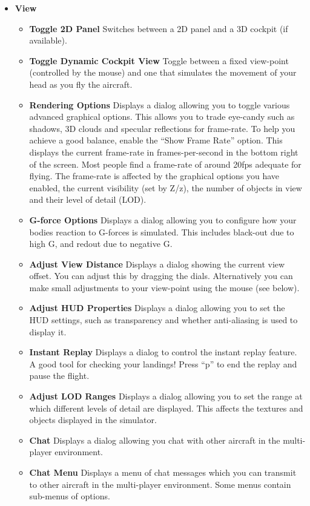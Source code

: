 \begin{itemize}
 \item \textbf{View}
 \begin{itemize}
  \item \textbf{Toggle 2D Panel}  Switches between a 2D panel and a 3D cockpit
(if available).
  \item \textbf{Toggle Dynamic Cockpit View}  Toggle between a fixed view-point
  (controlled by the mouse) and one that simulates the movement of your head as
  you fly the aircraft.
  \item \textbf{Rendering Options} Displays a dialog allowing you to toggle
various advanced graphical options.
  This allows you to trade eye-candy such as shadows, 3D clouds and specular
reflections for frame-rate.
  To help you achieve a good balance, enable the ``Show Frame Rate'' option.
  This displays the current frame-rate in frames-per-second in the bottom right
of the screen.
  Most people find a frame-rate of around 20fps adequate for flying. The
frame-rate is affected by the
  graphical options you have enabled, the current visibility (set by Z/z), the
number of objects in view
  and their level of detail (LOD).
  \item \textbf{G-force Options}  Displays a dialog allowing you to configure
how your bodies reaction to G-forces is simulated. This includes black-out due
to high G, and redout due to negative G.
  \item \textbf{Adjust View Distance}  Displays a dialog showing the current
view offset.
  You can adjust this by dragging the dials. Alternatively you can make small
adjustments
  to your view-point using the mouse (see below).
  \item \textbf{Adjust HUD Properties}  Displays a dialog allowing you to set
the HUD settings, such as transparency and whether anti-aliasing is used to display it.
  \item \textbf{Instant Replay} Displays a dialog to control the instant replay
feature.
  A good tool for checking your landings! Press ``p'' to end the replay and
pause the flight.
  \item \textbf{Adjust LOD Ranges} Displays a dialog allowing you to set the
range at which different
  levels of detail are displayed. This affects the textures and objects
displayed in the simulator.
  \item \textbf{Chat} Displays a dialog allowing you chat with other aircraft in
the multi-player environment.
  \item \textbf{Chat Menu} Displays a menu of chat messages which you can
  transmit to other aircraft in the multi-player environment. Some menus
  contain sub-menus of options.
 \end{itemize}


\end{itemize}
